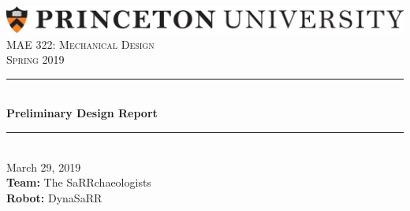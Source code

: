 

%

\begin{titlepage}

\newcommand{\HRule}{\rule{\linewidth}{0.5mm}} %

\center %
 
\includegraphics[width=\columnwidth]{./PU1linehighres.png}\\[1cm]
\textsc{\Large MAE 322: Mechanical Design}\\[0.5cm] %
\textsc{\large Spring 2019}\\[1cm] %


\HRule \\[0.6cm]
{ \huge \bfseries Preliminary Design Report}\\[0.4cm] %
\HRule \\[1cm]

{\Large March 29, 2019}\\[2cm] %

 

{\large \textbf{Team:} The SaRRchaeologists}\\[1cm]
{\large \textbf{Robot:} DynaSaRR}\\[1.6cm]


\end{titlepage}
